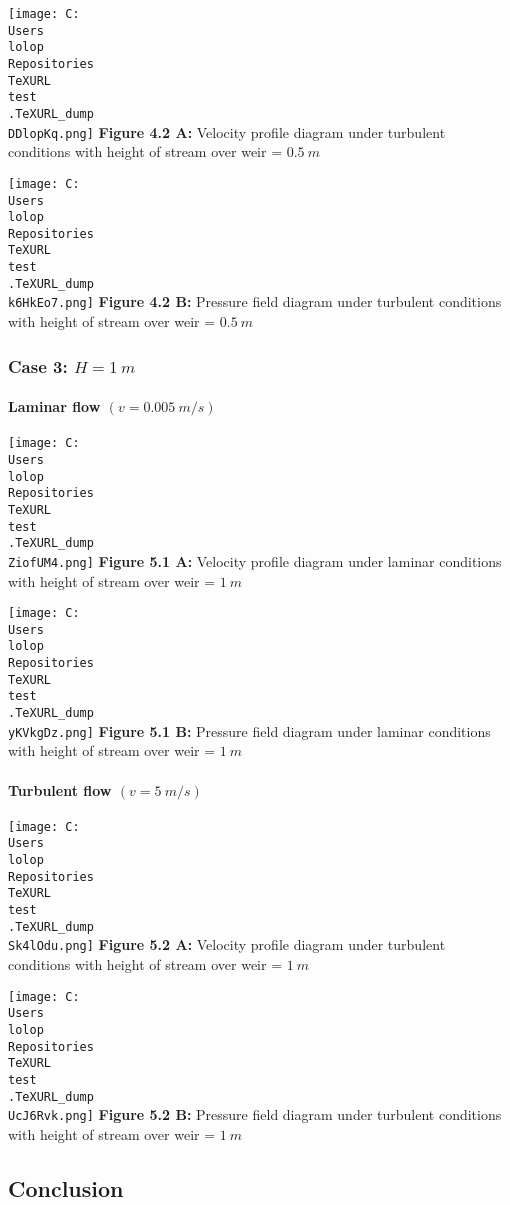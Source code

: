 \documentclass[11pt]{article}
\begin{document}
\texttt{[image: C:\\Users\\lolop\\Repositories\\TeXURL\\test\\.TeXURL\_dump\\DDlopKq.png]} \textbf{Figure 4.2 A:}
Velocity profile diagram under turbulent conditions with height of
stream over weir = \(0.5\ m\)

\texttt{[image: C:\\Users\\lolop\\Repositories\\TeXURL\\test\\.TeXURL\_dump\\k6HkEo7.png]} \textbf{Figure 4.2 B:}
Pressure field diagram under turbulent conditions with height of stream
over weir = \(0.5\ m\)

\hypertarget{case-3-h-1-m-1}{%
\subsubsection{\texorpdfstring{Case 3:
\(H = 1\ m\)}{Case 3: H = 1\textbackslash{} m}}\label{case-3-h-1-m-1}}

\hypertarget{laminar-flow-v-0.005-ms-2}{%
\paragraph{\texorpdfstring{Laminar flow
\((v = 0.005\ m/s)\)}{Laminar flow (v = 0.005\textbackslash{} m/s)}}\label{laminar-flow-v-0.005-ms-2}}

\texttt{[image: C:\\Users\\lolop\\Repositories\\TeXURL\\test\\.TeXURL\_dump\\ZiofUM4.png]} \textbf{Figure 5.1 A:}
Velocity profile diagram under laminar conditions with height of stream
over weir = \(1\ m\)

\texttt{[image: C:\\Users\\lolop\\Repositories\\TeXURL\\test\\.TeXURL\_dump\\yKVkgDz.png]} \textbf{Figure 5.1 B:}
Pressure field diagram under laminar conditions with height of stream
over weir = \(1\ m\)

\hypertarget{turbulent-flow-v-5-ms-2}{%
\paragraph{\texorpdfstring{Turbulent flow
\((v = 5\ m/s)\)}{Turbulent flow (v = 5\textbackslash{} m/s)}}\label{turbulent-flow-v-5-ms-2}}

\texttt{[image: C:\\Users\\lolop\\Repositories\\TeXURL\\test\\.TeXURL\_dump\\Sk4lOdu.png]} \textbf{Figure 5.2 A:}
Velocity profile diagram under turbulent conditions with height of
stream over weir = \(1\ m\)

\texttt{[image: C:\\Users\\lolop\\Repositories\\TeXURL\\test\\.TeXURL\_dump\\UcJ6Rvk.png]} \textbf{Figure 5.2 B:}
Pressure field diagram under turbulent conditions with height of stream
over weir = \(1\ m\)

\hypertarget{conclusion}{%
\subsection{Conclusion}\label{conclusion}}
\end{document}
